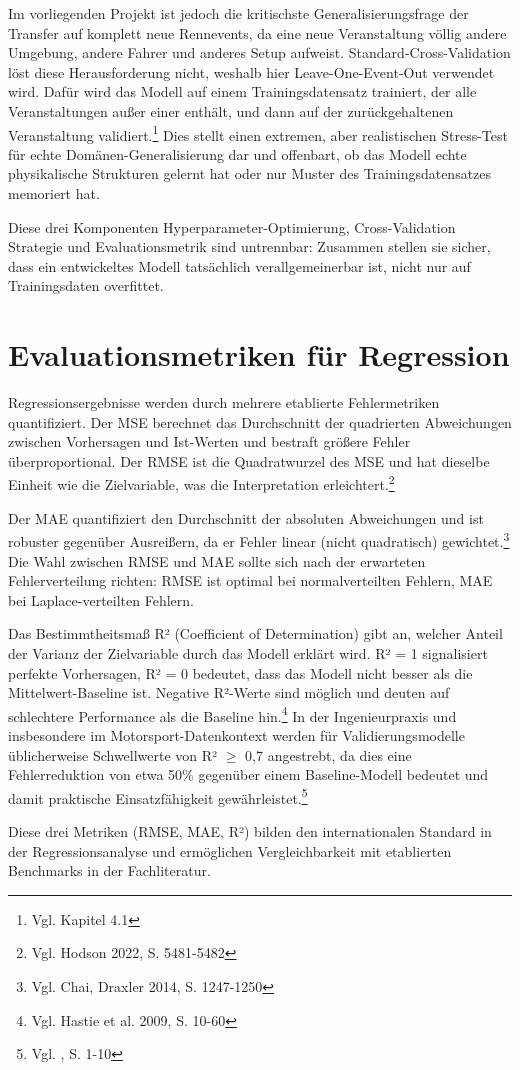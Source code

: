 Im vorliegenden Projekt ist jedoch die kritischste Generalisierungsfrage der Transfer auf komplett neue Rennevents, da eine neue Veranstaltung völlig andere Umgebung, andere Fahrer und anderes Setup aufweist. Standard-Cross-Validation löst diese Herausforderung nicht, weshalb hier Leave-One-Event-Out verwendet wird. Dafür wird das Modell auf einem Trainingsdatensatz trainiert, der alle Veranstaltungen außer einer enthält, und dann auf der zurückgehaltenen Veranstaltung validiert.\footnote{Vgl. Kapitel 4.1} Dies stellt einen extremen, aber realistischen Stress-Test für echte Domänen-Generalisierung dar und offenbart, ob das Modell echte physikalische Strukturen gelernt hat oder nur Muster des Trainingsdatensatzes memoriert hat.

Diese drei Komponenten Hyperparameter-Optimierung, Cross-Validation Strategie und Evaluationsmetrik sind untrennbar: Zusammen stellen sie sicher, dass ein entwickeltes Modell tatsächlich verallgemeinerbar ist, nicht nur auf Trainingsdaten overfittet.


\section{Evaluationsmetriken für Regression}

Regressionsergebnisse werden durch mehrere etablierte Fehlermetriken quantifiziert. Der \ac{MSE} berechnet das Durchschnitt der quadrierten Abweichungen zwischen Vorhersagen und Ist-Werten und bestraft größere Fehler überproportional. Der \ac{RMSE} ist die Quadratwurzel des MSE und hat dieselbe Einheit wie die Zielvariable, was die Interpretation erleichtert.\footnote{Vgl. Hodson 2022, S. 5481-5482}

Der \ac{MAE} quantifiziert den Durchschnitt der absoluten Abweichungen und ist robuster gegenüber Ausreißern, da er Fehler linear (nicht quadratisch) gewichtet.\footnote{Vgl. Chai, Draxler 2014, S. 1247-1250} Die Wahl zwischen RMSE und MAE sollte sich nach der erwarteten Fehlerverteilung richten: RMSE ist optimal bei normalverteilten Fehlern, MAE bei Laplace-verteilten Fehlern.

Das Bestimmtheitsmaß R² (Coefficient of Determination) gibt an, welcher Anteil der Varianz der Zielvariable durch das Modell erklärt wird. R² = 1 signalisiert perfekte Vorhersagen, R² = 0 bedeutet, dass das Modell nicht besser als die Mittelwert-Baseline ist. Negative R²-Werte sind möglich und deuten auf schlechtere Performance als die Baseline hin.\footnote{Vgl. Hastie et al. 2009, S. 10-60} In der Ingenieurpraxis und insbesondere im Motorsport-Datenkontext werden für 
Validierungsmodelle üblicherweise Schwellwerte von R² $\geq$ 0,7 angestrebt, 
da dies eine Fehlerreduktion von etwa 50\% gegenüber einem Baseline-Modell 
bedeutet und damit praktische Einsatzfähigkeit gewährleistet.\footnote{Vgl. \cite{ODonnell2024}, S. 1-10}


Diese drei Metriken (RMSE, MAE, R²) bilden den internationalen Standard in der Regressionsanalyse und ermöglichen Vergleichbarkeit mit etablierten Benchmarks in der Fachliteratur.
